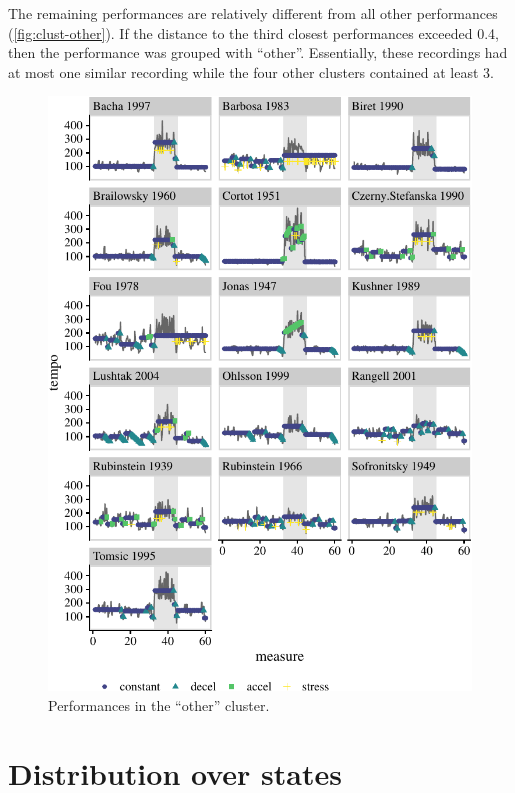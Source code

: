 \documentclass[aoas]{aoas/imsart}
\begin{document}
The remaining performances are relatively different from all other
performances (\autoref{fig:clust-other}). If the distance to the third
closest performances exceeded 0.4, then the performance was grouped with
``other''. Essentially, these recordings had at most one similar
recording while the four other clusters contained at least 3.

\begin{figure}

{\centering \includegraphics{gfx/clust-other-1} 

}

\caption{Performances in the ``other'' cluster.}\label{fig:clust-other}
\end{figure}

\hypertarget{distribution-over-states}{%
\section{Distribution over states}\label{distribution-over-states}}
\end{document}

